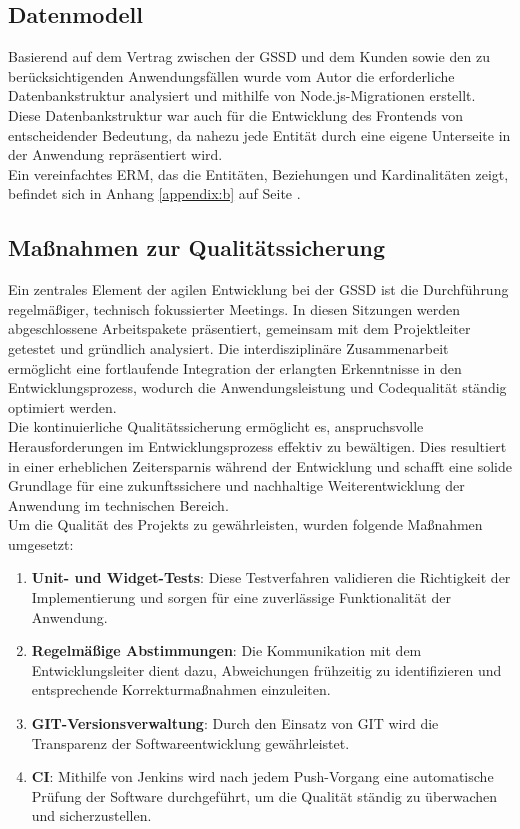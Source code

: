 \begin{flushleft}
		\subsection{Datenmodell}
			Basierend auf dem Vertrag zwischen der \acs{GSSD} und dem Kunden sowie den zu berücksichtigenden Anwendungsfällen wurde vom Autor die erforderliche Datenbankstruktur analysiert und mithilfe von Node.js-Migrationen erstellt.
			\\
			Diese Datenbankstruktur war auch für die Entwicklung des Frontends von entscheidender Bedeutung, da nahezu jede Entität durch eine eigene Unterseite in der Anwendung repräsentiert wird.
			\\
			Ein vereinfachtes \acs{ERM}, das die Entitäten, Beziehungen und Kardinalitäten zeigt, befindet sich in Anhang \ref{appendix:b} auf Seite \pageref{appendix:b}.

		\subsection{Maßnahmen zur Qualitätssicherung}

			Ein zentrales Element der agilen Entwicklung bei der \acs{GSSD} ist die Durchführung regelmäßiger, technisch fokussierter Meetings. In diesen Sitzungen werden abgeschlossene Arbeitspakete präsentiert, gemeinsam mit dem Projektleiter getestet und gründlich analysiert. Die interdisziplinäre Zusammenarbeit ermöglicht eine fortlaufende Integration der erlangten Erkenntnisse in den Entwicklungsprozess, wodurch die Anwendungsleistung und Codequalität ständig optimiert werden.
			\\
			Die kontinuierliche Qualitätssicherung ermöglicht es, anspruchsvolle Herausforderungen im Entwicklungsprozess effektiv zu bewältigen. Dies resultiert in einer erheblichen Zeitersparnis während der Entwicklung und schafft eine solide Grundlage für eine zukunftssichere und nachhaltige Weiterentwicklung der Anwendung im technischen Bereich.
			\\
			Um die Qualität des Projekts zu gewährleisten, wurden folgende Maßnahmen umgesetzt:
			\begin{enumerate}
				\item \textbf{Unit- und Widget-Tests}: Diese Testverfahren validieren die Richtigkeit der Implementierung und sorgen für eine zuverlässige Funktionalität der Anwendung.
				\item \textbf{Regelmäßige Abstimmungen}: Die Kommunikation mit dem Entwicklungsleiter dient dazu, Abweichungen frühzeitig zu identifizieren und entsprechende Korrekturmaßnahmen einzuleiten.
				\item \textbf{\acs{GIT}-Versionsverwaltung}: Durch den Einsatz von \acs{GIT} wird die Transparenz der Softwareentwicklung gewährleistet.
				\item \textbf{\acs{CI}}: Mithilfe von Jenkins wird nach jedem Push-Vorgang eine automatische Prüfung der Software durchgeführt, um die Qualität ständig zu überwachen und sicherzustellen.
			\end{enumerate}


\end{flushleft}
